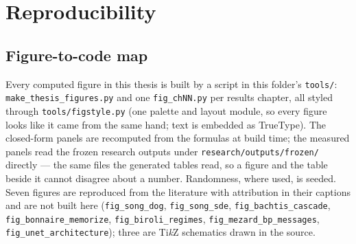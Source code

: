 \chapter{Reproducibility}\label{app:repro}

\setlength{\emergencystretch}{2em}

\section{Figure-to-code map}

Every computed figure in this thesis is built by a script in this folder's
\texttt{tools/}: \texttt{make\_thesis\_figures.py} and one
\texttt{fig\_chNN.py} per results chapter, all styled through
\texttt{tools/figstyle.py} (one palette and layout module, so every figure
looks like it came from the same hand; text is embedded as TrueType). The
closed-form panels are recomputed from the formulas at build time; the
measured panels read the frozen research outputs under
\texttt{research/outputs/frozen/} directly --- the same files
the generated tables read, so a figure and the table beside it cannot
disagree about a number. Randomness, where used, is seeded. Seven figures are
reproduced from the literature with attribution in their captions and are not
built here (\texttt{fig\_song\_dog}, \texttt{fig\_song\_sde},
\texttt{fig\_bachtis\_cascade}, \texttt{fig\_bonnaire\_memorize},
\texttt{fig\_biroli\_regimes}, \texttt{fig\_mezard\_bp\_messages},
\texttt{fig\_unet\_architecture}); three are Ti\emph{k}Z schematics drawn in
the source.

